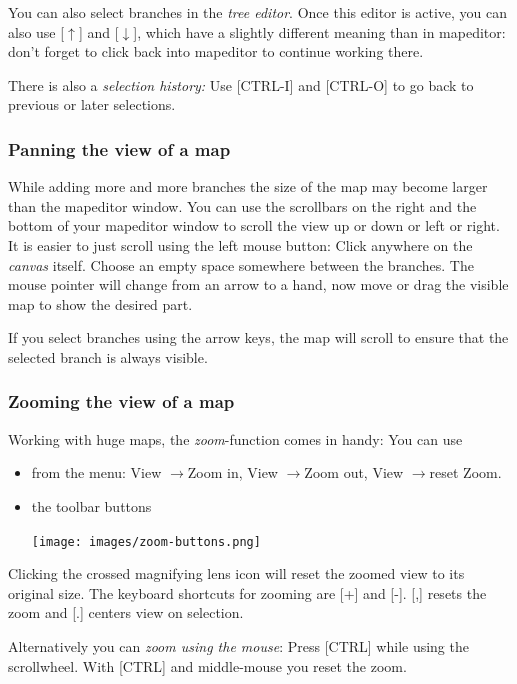\documentclass[12pt,a4paper]{article}
\newcommand{\ra}{$\longrightarrow$}
\newcommand{\ua}{$\uparrow$}
\newcommand{\da}{$\downarrow$}
\newcommand{\key}[1]{[#1]}
\begin{document}
You can also select branches in the {\em tree editor}. Once this editor
is active, you can also use \key{\ua} and \key {\da}, which have a
slightly different meaning than in mapeditor: don't forget to click back
into mapeditor to continue working there.

There is also a {\em selection history:} Use \key{CTRL-I} and
\key{CTRL-O} to go back to previous or later selections.

\subsubsection*{Panning the view of a map}
While adding more and more branches the size of the map may become
larger than the mapeditor window. You can use the scrollbars on the
right and the bottom of your mapeditor window to scroll the view up or
down or left or right. It is easier to just scroll using the left mouse
button: Click anywhere on the {\em canvas} itself. Choose an empty space
somewhere between the branches. The mouse pointer will change from an
arrow to a hand, now move or drag the visible map to show the desired
part.

If you select branches using the arrow keys, the map will scroll to
ensure that the selected branch is always visible.

\subsubsection*{Zooming the view of a map}
Working with huge maps, the {\em zoom}-function comes in handy: You can
use 
\begin{itemize}
    \item from the menu: View \ra Zoom in, View \ra Zoom out, View \ra reset Zoom.
    \item the toolbar buttons 
        \begin{center}
            \texttt{[image: images/zoom-buttons.png]}
        \end{center}    
\end{itemize}   
Clicking the crossed magnifying lens icon will reset the zoomed view to
its original size.  The keyboard shortcuts for zooming are \key{+} and
\key{-}. \key{,} resets the zoom and \key{.} centers view on selection.

Alternatively you can {\em zoom using the mouse}: Press \key{CTRL} while
using the scrollwheel. With \key{CTRL} and middle-mouse you reset the
zoom.
\end{document}
